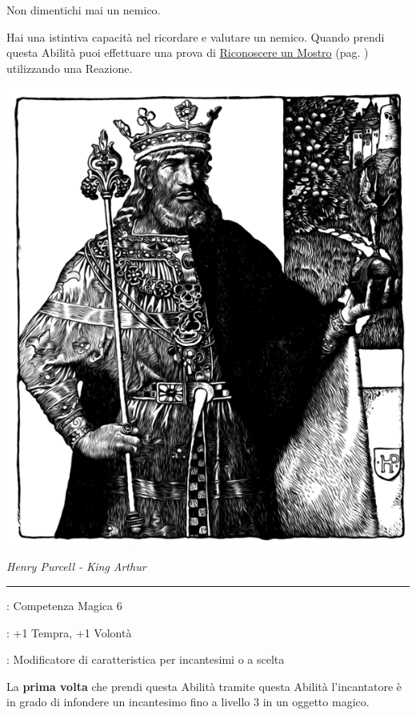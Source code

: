 \begin{multicols}{2}
Non dimentichi mai un nemico.

Hai una istintiva capacità nel ricordare e valutare un nemico. Quando prendi questa Abilità puoi effettuare una prova di \hyperlink{riconoscereimostri}{Riconoscere un Mostro} (pag. \pageref{riconoscereimostri}) utilizzando una Reazione.

\begin{center}
	\includegraphics[width=0.8\linewidth]{immagini/oggettimagiciuomo.png}

	\emph{Henry Purcell - King Arthur}
\end{center}

\smallskip\noindent\rule{\linewidth}{2pt} \hypertarget{Creare Oggetti Magici}{}\medskip{}
\noindent
\begin{description}[noitemsep, topsep=0pt, parsep=0pt, partopsep=0pt, leftmargin=0cm, labelwidth=2.5cm]
    \item[\textbf{Requisito}]: Competenza Magica 6
    \item[\textbf{Tiri Salvezza}]: +1 Tempra, +1 Volontà
    \item[\textbf{Caratteristica}]: Modificatore di caratteristica per incantesimi o a scelta
\end{description}

La \textbf{prima volta} che prendi questa Abilità tramite questa Abilità l'incantatore è in grado di infondere un incantesimo fino a livello 3 in un oggetto magico.


\end{multicols}
